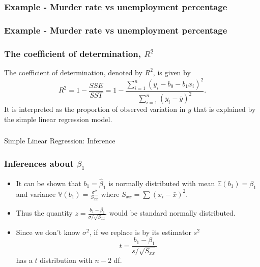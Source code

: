 \begin{frame}[fragile]\frametitle{Example - Murder rate vs unemployment percentage}

\end{frame}

\begin{frame}[fragile]\frametitle{Example - Murder rate vs unemployment percentage}


\end{frame}

\begin{frame}[fragile]\frametitle{The coefficient of determination, $R^{2}$}

The coefficient of determination, denoted by $R^{2}$, is given by
\begin{displaymath}
R^{2}=1-\frac{SSE}{SST}=1-\frac{\sum_{i=1}^{n}(y_{i}-b_{0}-b_{1}x_{i})^{2}}{\sum_{i=1}^{n}(y_{i}-\bar{y})^{2}}.
\end{displaymath}
It is interpreted as the proportion of observed variation in $y$ that is explained by the simple linear regression model. 

\end{frame}

\begin{frame}[fragile]\frametitle{}
\begin{center}
{\Large Simple Linear Regression: Inference}

\end{center}
\end{frame}



\begin{frame}[fragile]\frametitle{Inferences about $\beta_{1}$}

\begin{itemize}
\item It can be shown that $b_{1}=\hat{\beta}_{1}$ is normally distributed with mean $\mathbb{E}(b_{1})=\beta_{1}$ and variance $\mathbb{V}(b_{1})=\frac{\sigma^{2}}{S_{xx}}$ where $S_{xx}=\sum(x_{i}-\bar{x})^{2}$. 
\item Thus the quantity $z=\frac{b_{1}-\beta_{1}}{\sigma/\sqrt{S_{xx}}}$ would be standard normally distributed.
\item Since we don't know $\sigma^{2}$, if we replace is by its estimator $s^{2}$
\begin{displaymath}
t=\frac{b_{1}-\beta_{1}}{s/\sqrt{S_{xx}}}
\end{displaymath}
has a $t$ distribution with $n-2$ df.
\end{itemize}
\end{frame}

